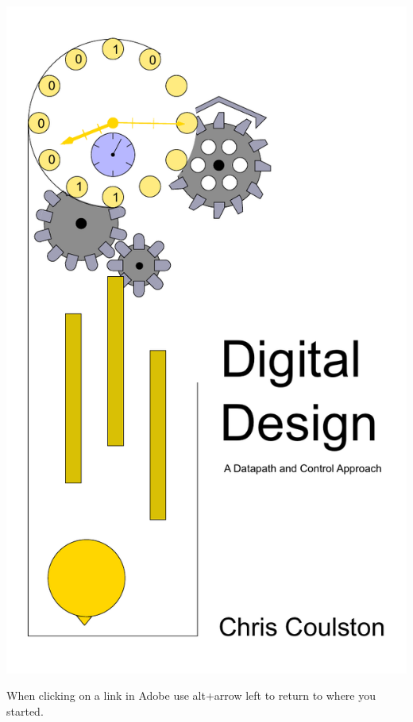 \documentclass[letterpaper, 10pt]{memoir}
\begin{document}


\frontmatter
\title{}
\includegraphics{./Fig/colorCover}
\maketitle



\tableofcontents
\vspace{0.4cm}
When clicking on a link in Adobe use alt+arrow left to return to where you started.
\mainmatter
\end{document}
